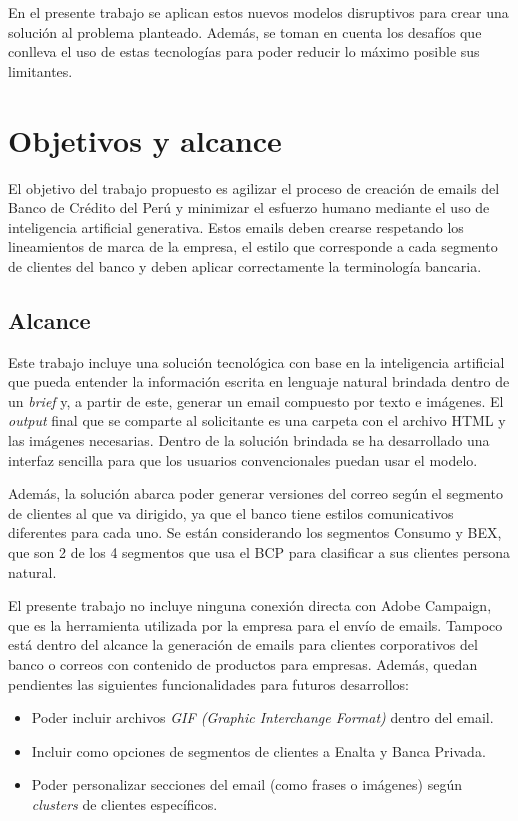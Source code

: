 En el presente trabajo se aplican estos nuevos modelos disruptivos para crear una solución al problema planteado. Además, se toman en cuenta los desafíos que conlleva el uso de estas tecnologías para poder reducir lo máximo posible sus limitantes.


\section{Objetivos y alcance}

El objetivo del trabajo propuesto es agilizar el proceso de creación de emails del Banco de Crédito del Perú y minimizar el esfuerzo humano mediante el uso de inteligencia artificial generativa. Estos emails deben crearse respetando los lineamientos de marca de la empresa, el estilo que corresponde a cada segmento de clientes del banco y deben aplicar correctamente la terminología bancaria.

\subsection{Alcance}

Este trabajo incluye una solución tecnológica con base en la inteligencia artificial que pueda entender la información escrita en lenguaje natural brindada dentro de un \textit{brief} y, a partir de este, generar un email compuesto por texto e imágenes. El \textit{output} final que se comparte al solicitante es una carpeta con el archivo HTML y las imágenes necesarias. Dentro de la solución brindada se ha desarrollado una interfaz sencilla para que los usuarios convencionales puedan usar el modelo.

Además, la solución abarca poder generar versiones del correo según el segmento de clientes al que va dirigido, ya que el banco tiene estilos comunicativos diferentes para cada uno. Se están considerando los segmentos Consumo y BEX, que son 2 de los 4 segmentos que usa el BCP para clasificar a sus clientes persona natural.

El presente trabajo no incluye ninguna conexión directa con Adobe Campaign, que es la herramienta utilizada por la empresa para el envío de emails. Tampoco está dentro del alcance la generación de emails para clientes corporativos del banco o correos con contenido de productos para empresas. Además, quedan pendientes las siguientes funcionalidades para futuros desarrollos:

\begin{itemize}
    \item Poder incluir archivos \textit{GIF (Graphic Interchange Format)} dentro del email.
    \item Incluir como opciones de segmentos de clientes a Enalta y Banca Privada.
    \item Poder personalizar secciones del email (como frases o imágenes) según \textit{clusters} de clientes específicos.
\end{itemize}

